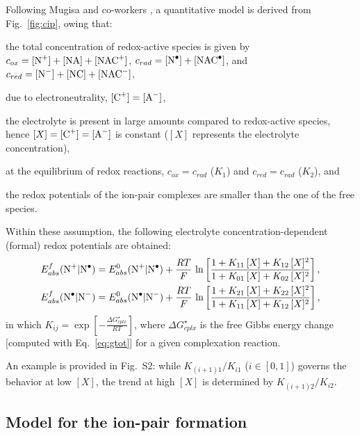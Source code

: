 \documentclass[review]{elsarticle}
\begin{document}
Following Mugisa and co-workers \cite{mugisaEffectIonparingKinetics2024}, a quantitative model is derived from Fig.~\ref{fig:cip}, owing that: \begin{inparaenum}[(i)]
	\item the total concentration of redox-active species is given by $c_{ox} = [\ce{N+}] + [\ce{NA}] + [\ce{NAC+}]$, $c_{rad} = [\ce{N^.}] + [\ce{NAC^.}]$, and $c_{red} =  [\ce{N-}] + [\ce{NC}] + [\ce{NAC-}]$,
	\item due to electroneutrality, $ [\ce{C+}] = [\ce{A-}] $,
	\item the electrolyte is present in large amounts compared to redox-active species, hence $[X] = [\ce{C+}] = [\ce{A-}] $ is constant ($[X]$ represents the electrolyte concentration),
	\item at the equilibrium of redox reactions, $c_{ox} = c_{rad}$ ($K_1$) and $c_{red} = c_{rad}$ ($K_2$), and
	\item the redox potentials of the ion-pair complexes are smaller than the one of the free species.
\end{inparaenum}
Within these assumption, the following electrolyte concentration-dependent (formal) redox potentials are obtained:\begin{align}
	E^f_{abs}(\ce{N+|N^.}) &= E^0_ {abs}(\ce{N+|N^.})+\frac{RT}{F}\,\ln\left[\frac{1+K_{11}\,[X]+K_{12}\,[X]^2}{1+K_{01}\,[X]+K_{02}\,[X]^2}\right],\\
	E^f_{abs}(\ce{N^.|N-}) &= E^0_ {abs}(\ce{N^.|N-})+\frac{RT}{F}\,\ln\left[\frac{1+K_{21}\,[X]+K_{22}\,[X]^2}{1+K_{11}\,[X]+K_{12}\,[X]^2}\right],
\end{align}
in which $K_{ij}= \exp\left[-\frac{\Delta G_{cplx}^\star}{RT}\right]$, where $\Delta G_{cplx}^\star$ is the free Gibbs energy change [computed with Eq.~\eqref{eq:gtot}] for a given complexation reaction.

An example is provided in Fig.~S2: while $K_{(i+1)1} / K_{i1}$ ($i\in[0,1]$) governs the behavior at low $[X]$, the trend at high $[X]$ is determined by $K_{(i+1)2} / K_{i2}$.

\subsection{Model for the ion-pair formation}
\end{document}

